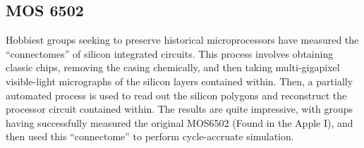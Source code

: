 \documentclass{article}
\begin{document}
\subsection{MOS 6502}

Hobbiest groups seeking to preserve historical microprocessors have
measured the ``connectomes'' of silicon integrated circuits. This
process involves obtaining classic chips, removing the casing
chemically, and then taking multi-gigapixel visible-light micrographs
of the silicon layers contained within. Then, a partially automated
process is used to read out the silicon polygons and reconstruct the
processor circuit contained within. The results are quite impressive,
with groups having successfully measured the original MOS6502 (Found
in the Apple I), and then used this ``connectome'' to perform
cycle-accruate simulation.
\end{document}
